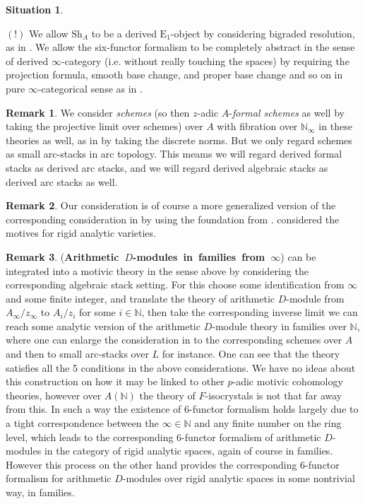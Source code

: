 \documentclass[12pt]{article}
\theoremstyle{definition}
\newtheorem{remark}{Remark}
\newtheorem{situation}{Situation}
\begin{document}
\begin{situation}
\begin{itemize}
\end{itemize}
$(!)$ We allow $\mathrm{Sh}_A$ to be a derived $\mathrm{E}_1$-object by considering bigraded resolution, as in \cite{3SI}. We allow the six-functor formalism to be completely abstract in the sense of derived $\infty$-category (i.e. without really touching the spaces) by requiring the projection formula, smooth base change, and proper base change and so on in pure $\infty$-categorical sense as in \cite{3CS1}.

\end{situation}

\begin{remark}
We consider \textit{schemes} (so then $z$-adic $A$-\textit{formal schemes} as well by taking the projective limit over schemes) over $A$ with fibration over $\mathbb{N}_\infty$ in these theories as well, as in \cite{3S} by taking the discrete norms. But we only regard schemes as small arc-stacks in arc topology. This meams we will regard derived formal stacks as derived arc stacks, and we will regard derived algebraic stacks as derived arc stacks as well.
\end{remark}

\begin{remark}
Our consideration is of course a more generalized version of the corresponding consideration in \cite{3A} by using the foundation from \cite{3S}. \cite{3A} considered the motives for rigid analytic varieties.
\end{remark}

\begin{remark}\mbox{(\textbf{Arithmetic $D$-modules in families from $\infty$})}
\cite{3A1} can be integrated into a motivic theory in the sense above by considering the corresponding algebraic stack setting. For this choose some identification from $\infty$ and some finite integer, and translate the theory of arithmetic $D$-module from $A_\infty/z_\infty$ to $A_i/z_i$ for some $i \in \mathbb{N}$, then take the corresponding inverse limit we can reach some analytic version of the arithmetic $D$-module theory in families over $\mathbb{N}$, where one can enlarge the consideration in \cite{3A} to the corresponding schemes over $A$ and then to small arc-stacks over $L$ for instance. One can see that the theory satisfies all the 5 conditions in the above considerations. We have no ideas about this construction on how it may be linked to other $p$-adic motivic cohomology theories, however over $A(\mathbb{N})$ the theory of $F$-isocrystals is not that far away from this. In such a way the existence of 6-functor formalism holds largely due to a tight correspondence between the $\infty\in \mathbb{N}$ and any finite number on the ring level, which leads to the corresponding 6-functor formalism of arithmetic $D$-modules in the category of rigid analytic spaces, again of course in families. However this process on the other hand provides the corresponding 6-functor formalism for arithmetic $D$-modules over rigid analytic spaces in some nontrivial way, in families.
\end{remark}
\end{document}
